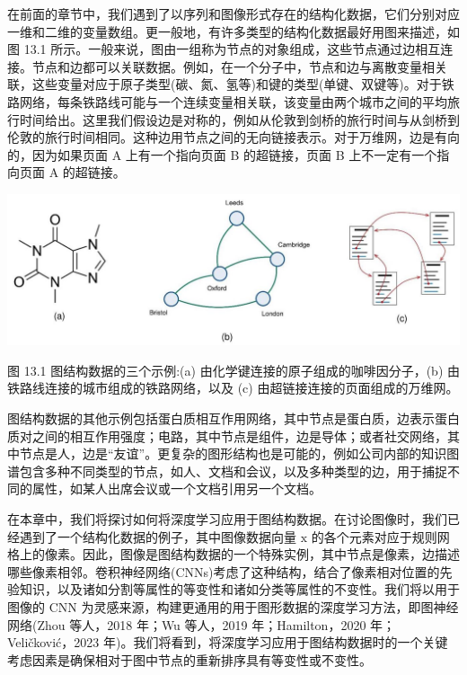 \documentclass[10pt]{article}
\begin{document}
在前面的章节中，我们遇到了以序列和图像形式存在的结构化数据，它们分别对应一维和二维的变量数组。更一般地，有许多类型的结构化数据最好用图来描述，如图 13.1 所示。一般来说，图由一组称为节点的对象组成，这些节点通过边相互连接。节点和边都可以关联数据。例如，在一个分子中，节点和边与离散变量相关联，这些变量对应于原子类型(碳、氮、氢等)和键的类型(单键、双键等)。对于铁路网络，每条铁路线可能与一个连续变量相关联，该变量由两个城市之间的平均旅行时间给出。这里我们假设边是对称的，例如从伦敦到剑桥的旅行时间与从剑桥到伦敦的旅行时间相同。这种边用节点之间的无向链接表示。对于万维网，边是有向的，因为如果页面 A 上有一个指向页面 B 的超链接，页面 B 上不一定有一个指向页面 A 的超链接。

\begin{center}
\includegraphics[max width=1.0\textwidth]{images/0194e279-9b28-703a-88f4-c3ac21e2010d_427_231_375_1334_446_0.jpg}
\end{center}
\hspace*{3em} 

图 13.1 图结构数据的三个示例:(a) 由化学键连接的原子组成的咖啡因分子，(b) 由铁路线连接的城市组成的铁路网络，以及 (c) 由超链接连接的页面组成的万维网。

图结构数据的其他示例包括蛋白质相互作用网络，其中节点是蛋白质，边表示蛋白质对之间的相互作用强度；电路，其中节点是组件，边是导体；或者社交网络，其中节点是人，边是“友谊”。更复杂的图形结构也是可能的，例如公司内部的知识图谱包含多种不同类型的节点，如人、文档和会议，以及多种类型的边，用于捕捉不同的属性，如某人出席会议或一个文档引用另一个文档。

在本章中，我们将探讨如何将深度学习应用于图结构数据。在讨论图像时，我们已经遇到了一个结构化数据的例子，其中图像数据向量 \(\mathrm{x}\) 的各个元素对应于规则网格上的像素。因此，图像是图结构数据的一个特殊实例，其中节点是像素，边描述哪些像素相邻。卷积神经网络(CNNs)考虑了这种结构，结合了像素相对位置的先验知识，以及诸如分割等属性的等变性和诸如分类等属性的不变性。我们将以用于图像的 CNN 为灵感来源，构建更通用的用于图形数据的深度学习方法，即图神经网络(Zhou 等人，2018 年；Wu 等人，2019 年；Hamilton，2020 年；Veličković，2023 年)。我们将看到，将深度学习应用于图结构数据时的一个关键考虑因素是确保相对于图中节点的重新排序具有等变性或不变性。
\end{document}
